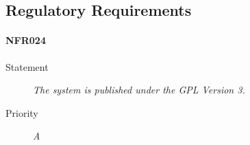 \subsection{Regulatory Requirements}

\paragraph{NFR024}
\begin{description}
\item[Statement] \textit{The system is published under the GPL Version 3.}
\item[Priority] \textit{A}
\end{description}

